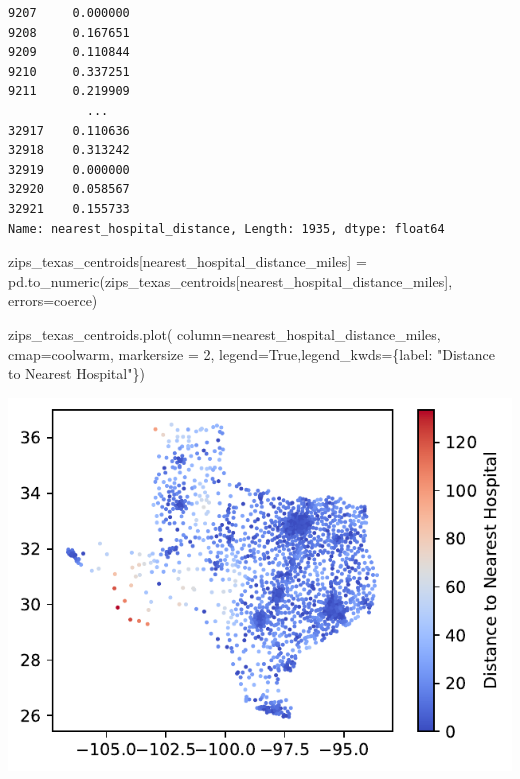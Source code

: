 \documentclass[
  letterpaper,
  DIV=11,
  numbers=noendperiod]{scrartcl}
\newenvironment{Shaded}{\begin{snugshade}}{\end{snugshade}}
\newcommand{\DecValTok}[1]{\textcolor[rgb]{0.68,0.00,0.00}{#1}}
\newcommand{\NormalTok}[1]{\textcolor[rgb]{0.00,0.23,0.31}{#1}}
\newcommand{\OperatorTok}[1]{\textcolor[rgb]{0.37,0.37,0.37}{#1}}
\newcommand{\StringTok}[1]{\textcolor[rgb]{0.13,0.47,0.30}{#1}}
\newcommand{\VariableTok}[1]{\textcolor[rgb]{0.07,0.07,0.07}{#1}}
\begin{document}
\begin{verbatim}
9207     0.000000
9208     0.167651
9209     0.110844
9210     0.337251
9211     0.219909
           ...   
32917    0.110636
32918    0.313242
32919    0.000000
32920    0.058567
32921    0.155733
Name: nearest_hospital_distance, Length: 1935, dtype: float64
\end{verbatim}

\begin{Shaded}
\begin{Highlighting}[]
\NormalTok{zips\_texas\_centroids[}\StringTok{\textquotesingle{}nearest\_hospital\_distance\_miles\textquotesingle{}}\NormalTok{] }\OperatorTok{=}\NormalTok{ pd.to\_numeric(zips\_texas\_centroids[}\StringTok{\textquotesingle{}nearest\_hospital\_distance\_miles\textquotesingle{}}\NormalTok{], errors}\OperatorTok{=}\StringTok{\textquotesingle{}coerce\textquotesingle{}}\NormalTok{)}

\NormalTok{zips\_texas\_centroids.plot(}
\NormalTok{    column}\OperatorTok{=}\StringTok{\textquotesingle{}nearest\_hospital\_distance\_miles\textquotesingle{}}\NormalTok{, }
\NormalTok{    cmap}\OperatorTok{=}\StringTok{\textquotesingle{}coolwarm\textquotesingle{}}\NormalTok{, markersize }\OperatorTok{=} \DecValTok{2}\NormalTok{,}
\NormalTok{    legend}\OperatorTok{=}\VariableTok{True}\NormalTok{,legend\_kwds}\OperatorTok{=}\NormalTok{\{}\StringTok{\textquotesingle{}label\textquotesingle{}}\NormalTok{: }\StringTok{"Distance to Nearest Hospital"}\NormalTok{\})}
\end{Highlighting}
\end{Shaded}

\includegraphics{ps4_files/figure-pdf/cell-31-output-1.pdf}
\end{document}
